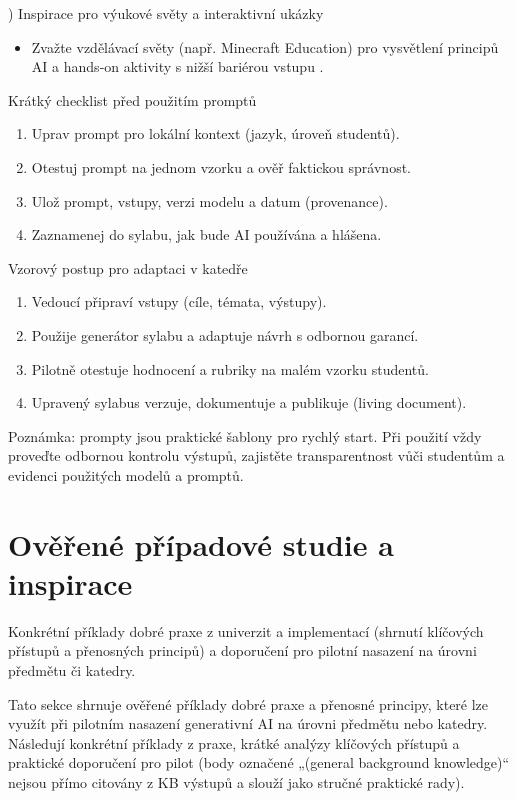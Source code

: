 \documentclass{report}%
\begin{document}
\medskip
{}) Inspirace pro výukové světy a interaktivní ukázky
\begin{itemize}
  \item Zvažte vzdělávací světy (např. Minecraft Education) pro vysvětlení principů AI a hands‑on aktivity s nižší bariérou vstupu \cite{kb_ai_101_tipu_pdf_04e4a115_page_15_2}.
\end{itemize}

\bigskip
\noindent Krátký checklist před použitím promptů
\begin{enumerate}
  \item Uprav prompt pro lokální kontext (jazyk, úroveň studentů).
  \item Otestuj prompt na jednom vzorku a ověř faktickou správnost.
  \item Ulož prompt, vstupy, verzi modelu a datum (provenance).
  \item Zaznamenej do sylabu, jak bude AI používána a hlášena.
\end{enumerate}

\medskip
\noindent Vzorový postup pro adaptaci v katedře
\begin{enumerate}
  \item Vedoucí připraví vstupy (cíle, témata, výstupy).
  \item Použije generátor sylabu a adaptuje návrh s odbornou garancí.
  \item Pilotně otestuje hodnocení a rubriky na malém vzorku studentů.
  \item Upravený sylabus verzuje, dokumentuje a publikuje (living document).
\end{enumerate}

\bigskip
\noindent Poznámka: prompty jsou praktické šablony pro rychlý start. Při použití vždy proveďte odbornou kontrolu výstupů, zajistěte transparentnost vůči studentům a evidenci použitých modelů a promptů.%

%
\section{Ověřené případové studie a inspirace}%
Konkrétní příklady dobré praxe z univerzit a implementací (shrnutí klíčových přístupů a přenosných principů) a doporučení pro pilotní nasazení na úrovni předmětu či katedry.%


%
Tato sekce shrnuje ověřené příklady dobré praxe a přenosné principy, které lze využít při pilotním nasazení generativní AI na úrovni předmětu nebo katedry.
Následují konkrétní příklady z praxe, krátké analýzy klíčových přístupů a praktické doporučení pro pilot (body označené „(general background knowledge)“ nejsou přímo citovány z KB výstupů a slouží jako stručné praktické rady).
\end{document}
